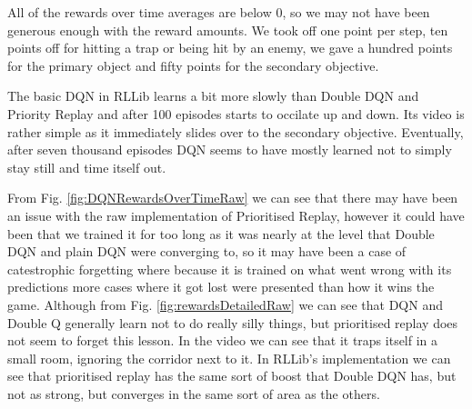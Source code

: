 \documentclass[a4pape, 11pt, english]{article}
\begin{document}

All of the rewards over time averages are below 0, so we may not have been generous enough with the reward amounts. We took off one point per step, ten points off for hitting a trap or being hit by an enemy, we gave a hundred points for the primary object and fifty points for the secondary objective.

The basic DQN in RLLib learns a bit more slowly than Double DQN and Priority Replay and after 100 episodes starts to occilate up and down. Its video is rather simple as it immediately slides over to the secondary objective. Eventually, after seven thousand episodes DQN seems to have mostly learned not to simply stay still and time itself out.

From Fig. \ref{fig:DQNRewardsOverTimeRaw} we can see that there may have been an issue with the raw implementation of Prioritised Replay, however it could have been that we trained it for too long as it was nearly at the level that Double DQN and plain DQN were converging to, so it may have been a case of catestrophic forgetting where because it is trained on what went wrong with its predictions more cases where it got lost were presented than how it wins the game. Although from Fig. \ref{fig:rewardsDetailedRaw} we can see that DQN and Double Q generally learn not to do really silly things, but prioritised replay does not seem to forget this lesson. In the video we can see that it traps itself in a small room, ignoring the corridor next to it. In RLLib's implementation we can see that prioritised replay has the same sort of boost that Double DQN has, but not as strong, but converges in the same sort of area as the others.
\end{document}
